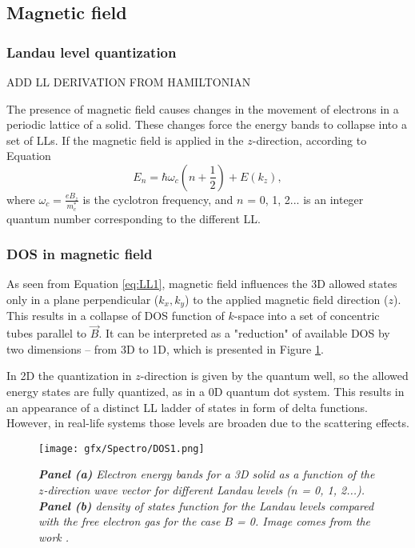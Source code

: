 \documentclass[titlepage,a4paper]{book}
\newcommand{\wciecie}{\quad\phantom{v}}
\begin{document}
\subsection{Magnetic field}
\label{section:DOS_at_magneticField}
\wciecie
\subsubsection{Landau level quantization}
ADD LL DERIVATION FROM HAMILTONIAN

The presence of magnetic field causes changes in the movement of electrons in a periodic lattice of a solid. These changes force the energy bands to collapse into a set of LLs. If the magnetic field is applied in the $z$-direction, according to Equation
\begin{equation}
\label{eq:LL1}
E_n = \hbar\omega_c\left( n+\frac{1}{2} \right) + E(k_z),
\end{equation}
where $\omega_c = \frac{eB_z}{m_c^*}$ is the cyclotron frequency, and $n$ = 0, 1, 2... is an integer quantum number corresponding to the different LL.

\subsubsection{DOS in magnetic field}
\wciecie
As seen from Equation \ref{eq:LL1}, magnetic field influences the 3D allowed states only in a plane perpendicular ($k_x,k_y$) to the applied magnetic field direction ($z$). This results in a collapse of DOS function of $k$-space into a set of concentric tubes parallel to $\vec{B}$. It can be interpreted as a "reduction" of available DOS by two dimensions -- from 3D to 1D, which is presented in Figure \ref{fig:DOS1}. 

In 2D the quantization in $z$-direction is given by the quantum well, so the allowed energy states are fully quantized, as in a 0D quantum dot system. This results in an appearance of a distinct LL ladder of states in form of delta functions. However, in real-life systems those levels are broaden due to the scattering effects.
\begin{figure}[H]
	\centering
	\texttt{[image: gfx/Spectro/DOS1.png]}
	\vspace{-10pt}
	\caption{\textit{\textbf{Panel (a)} Electron energy bands for a 3D solid as a function of the $z$-direction wave vector for different Landau levels ($n$ = 0, 1, 2...). \textbf{Panel (b)} density of states function for the Landau levels compared with the free electron gas for the case $B$ = 0. Image comes from the work \cite{Martinez_Nanotechnology}.}}
	\label{fig:DOS1}
\end{figure}
\end{document}
